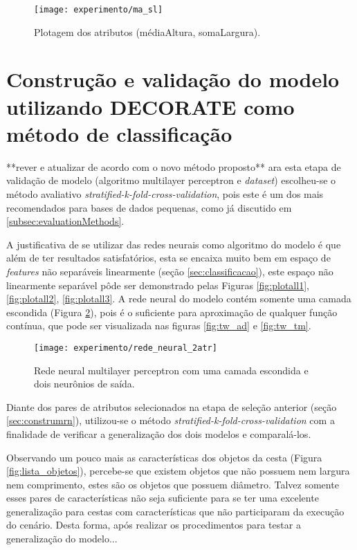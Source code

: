 \begin{figure}[!htb] \centering 
  \centering
  \texttt{[image: experimento/ma\_sl]} 
  \caption{Plotagem dos atributos (médiaAltura, somaLargura). } 
  \label{fig:ma_sl}
\end{figure}

\section{Construção e validação do modelo utilizando DECORATE como método de classificação}
\label{sec:constvalidacao}**rever e atualizar de acordo com o novo método proposto**
ara esta etapa de validação de modelo (algoritmo multilayer perceptron e \textit{dataset}) escolheu-se o método avaliativo \textit{stratified-k-fold-cross-validation}, pois este é um dos mais recomendados para bases de dados pequenas, como já discutido em \ref{subsec:evaluationMethods}. 

A justificativa de se utilizar das redes neurais como algoritmo do modelo é que além de ter resultados satisfatórios, esta se encaixa muito bem em espaço de \textit{features} não separáveis linearmente (seção \ref{sec:classificacao}), este espaço não linearmente separável pôde ser demonstrado pelas Figuras \ref{fig:plotall1}, \ref{fig:plotall2}, \ref{fig:plotall3}. A rede neural do modelo contém somente uma camada escondida (Figura \ref{fig:rede_neural_2atr}), pois é o suficiente para aproximação de qualquer função contínua\cite{Pasini:2015}, que pode ser visualizada nas figuras \ref{fig:tw_ad} e \ref{fig:tw_tm}.

\begin{figure}[!htb] \centering 
  \centering
  \texttt{[image: experimento/rede\_neural\_2atr]} 
  \caption{Rede neural multilayer perceptron com uma camada escondida e dois neurônios de saída. } 
  \label{fig:rede_neural_2atr}
\end{figure}

Diante dos pares de atributos selecionados na etapa de seleção anterior (seção \ref{sec:construmrn}), utilizou-se o método \textit{stratified-k-fold-cross-validation} com a finalidade de verificar a generalização dos dois modelos e comparalá-los.

Observando um pouco mais as características dos objetos da cesta (Figura \ref{fig:lista_objetos}), percebe-se que existem objetos que não possuem nem largura nem comprimento, estes são os objetos que possuem diâmetro. Talvez somente esses pares de características não seja suficiente para se ter uma excelente generalização para cestas com características que não participaram da execução do cenário. Desta forma, após realizar os procedimentos para testar a generalização do modelo... 

